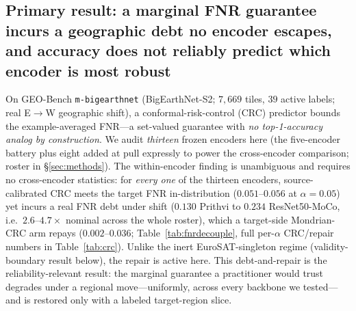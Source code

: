 \documentclass[journal]{IEEEtran}
\renewcommand{\_}{\textunderscore\allowbreak}
\begin{document}
\subsection{Primary result: a marginal FNR guarantee incurs a geographic debt no encoder escapes, and accuracy does not reliably predict which encoder is most robust}
On GEO-Bench \texttt{m-bigearthnet} (BigEarthNet-S2; $7{,}669$ tiles, $39$ active labels; real E$\to$W
geographic shift), a conformal-risk-control (CRC) predictor \citep{angelopoulos2024crc} bounds the
example-averaged FNR---a set-valued guarantee with \emph{no top-1-accuracy analog by construction}.
We audit \emph{thirteen} frozen encoders here (the five-encoder battery plus eight added at pull
expressly to power the cross-encoder comparison; roster in \S\ref{sec:methods}).
The within-encoder finding is unambiguous and requires no cross-encoder statistics: for \emph{every one}
of the thirteen encoders, source-calibrated CRC meets the target FNR in-distribution ($0.051$--$0.056$ at
$\alpha{=}0.05$) yet incurs a real FNR debt under shift ($0.130$ Prithvi to $0.234$ ResNet50-MoCo, i.e.\
$2.6$--$4.7\times$ nominal across the whole roster), which a target-side Mondrian-CRC arm repays
($0.002$--$0.036$; Table~\ref{tab:fnrdecouple}, full per-$\alpha$ CRC/repair numbers in
Table~\ref{tab:crc}). Unlike the inert EuroSAT-singleton regime (validity-boundary result below), the
repair is active here. This debt-and-repair is the reliability-relevant result: the marginal guarantee a
practitioner would trust degrades under a regional move---uniformly, across every backbone we tested---and
is restored only with a labeled target-region slice.
\end{document}
